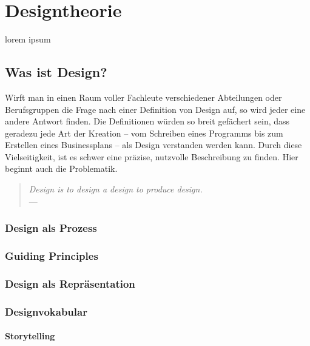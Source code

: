 \chapter{Designtheorie}\label{ch:designTheorie}

lorem ipsum

\section{Was ist Design?}
Wirft man in einen Raum voller Fachleute verschiedener Abteilungen oder Berufsgruppen die Frage nach einer Definition von Design auf, so wird jeder eine andere Antwort finden. Die Definitionen würden so breit gefächert sein, dass geradezu jede Art der Kreation – vom Schreiben eines Programms bis zum Erstellen eines Businessplans – als Design verstanden werden kann. Durch diese Vielseitigkeit, ist es schwer eine präzise, nutzvolle Beschreibung zu finden.  Hier beginnt auch die Problematik. \citep{sagmeister:2008}

\medskip 
\begin{quote}
	\begin{flushright}{\slshape    
	    Design is to design a design to produce design.} \\ \medskip
	    ---  \citep{heskett:2005}
	\end{flushright}
\end{quote}

\subsection{Design als Prozess}
\subsection{Guiding Principles}
\subsection{Design als Repräsentation}
\subsection{Designvokabular}
\subsubsection{Storytelling}
